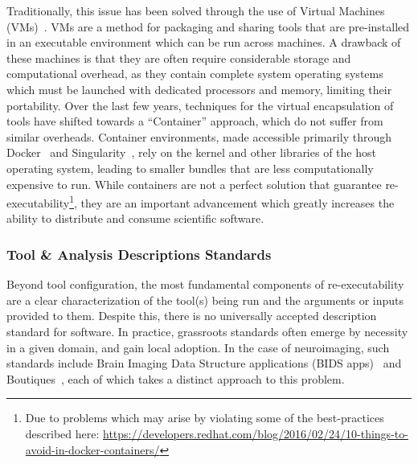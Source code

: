 Traditionally, this issue has been solved through the use of Virtual Machines (VMs)~\cite{smith2005virtual}. VMs are a
method for packaging and sharing tools that are pre-installed in an executable environment which can be run across
machines. A drawback of these machines is that they are often require considerable storage and computational overhead,
as they contain complete system operating systems which must be launched with dedicated processors and memory, limiting
their portability. Over the last few years, techniques for the virtual encapsulation of tools have shifted towards a
``Container'' approach, which do not suffer from similar overheads. Container environments, made accessible primarily
through Docker~\cite{merkel2014docker} and Singularity~\cite{kurtzer2017singularity}, rely on the kernel and other
libraries of the host operating system, leading to smaller bundles that are less computationally expensive to run.
While containers are not a perfect solution that guarantee re-executability\footnote{Due to problems which may arise by
violating some of the best-practices described here:
\url{https://developers.redhat.com/blog/2016/02/24/10-things-to-avoid-in-docker-containers/}}, they are an important
advancement which greatly increases the ability to distribute and consume scientific software.

\subsubsection{Tool \& Analysis Descriptions Standards}
Beyond tool configuration, the most fundamental components of re-executability are a clear characterization of the
tool(s) being run and the arguments or inputs provided to them. Despite this, there is no universally accepted
description standard for software. In practice, grassroots standards often emerge by necessity in a given domain, and
gain local adoption. In the case of neuroimaging, such standards include Brain Imaging Data Structure applications
(BIDS apps)~\cite{gorgolewski2017bids} and Boutiques~\cite{Glatard2018-tu}, each of which takes a distinct approach to
this problem.

